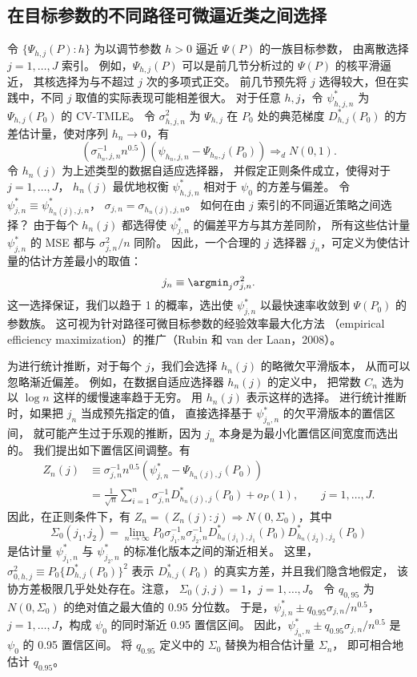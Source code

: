 \subsection{在目标参数的不同路径可微逼近类之间选择}

令 $\{\Psi_{h,j}(P):h\}$ 为以调节参数 $h>0$ 逼近 $\Psi(P)$ 的一族目标参数，
由离散选择 $j=1,\ldots,J$ 索引。
例如，$\Psi_{h,j}(P)$ 可以是前几节分析过的 $\Psi(P)$ 的核平滑逼近，
其核选择为与不超过 $j$ 次的多项式正交。
前几节预先将 $j$ 选得较大，但在实践中，不同 $j$ 取值的实际表现可能相差很大。
对于任意 $h,j$，令 $\psi^*_{h,j,n}$ 为 $\Psi_{h,j}(P_0)$ 的 CV-TMLE。
令 $\sigma_{h,j,n}^2$ 为 $\Psi_{h,j}$ 在 $P_0$ 处的典范梯度
$D_{h,j}^*(P_0)$ 的方差估计量，使对序列 $h_n\to0$，有
\[
 (\sigma^{-1}_{h_n,j,n}n^{0.5})
 (\psi_{h_n,j,n}-\Psi_{h_n,j}(P_0))\Rightarrow_dN(0,1).
\]
令 $h_n(j)$ 为上述类型的数据自适应选择器，
并假定正则条件成立，使得对于 $j=1,\ldots,J$，
$h_n(j)$ 最优地权衡 $\psi^*_{h,j,n}$ 相对于 $\psi_0$ 的方差与偏差。
令 $\psi^*_{j,n}\equiv\psi^*_{h_n(j),j,n}$，
$\sigma_{j,n}=\sigma_{h_n(j),j,n}$。
如何在由 $j$ 索引的不同逼近策略之间选择？
由于每个 $h_n(j)$ 都选得使 $\psi^*_{j,n}$ 的偏差平方与其方差同阶，
所有这些估计量 $\psi^*_{j,n}$ 的 MSE 都与 $\sigma_{j,n}^2/n$ 同阶。
因此，一个合理的 $j$ 选择器 $j_n$，可定义为使估计量的估计方差最小的取值：
\[
 j_n\equiv\argmin_j\sigma_{j,n}^2.
\]
这一选择保证，我们以趋于 1 的概率，选出使
$\psi^*_{j,n}$ 以最快速率收敛到 $\Psi(P_0)$ 的参数族。
这可视为针对路径可微目标参数的经验效率最大化方法
（empirical efficiency maximization）的推广（Rubin 和 van der Laan，2008）。

为进行统计推断，对于每个 $j$，我们会选择 $h_n(j)$ 的略微欠平滑版本，
从而可以忽略渐近偏差。
例如，在数据自适应选择器 $h_n(j)$ 的定义中，
把常数 $C_n$ 选为以 $\log n$ 这样的缓慢速率趋于无穷。
用 $h_n(j)$ 表示这样的选择。
进行统计推断时，如果把 $j_n$ 当成预先指定的值，
直接选择基于 $\psi^*_{j_n,n}$ 的欠平滑版本的置信区间，
就可能产生过于乐观的推断，因为 $j_n$ 本身是为最小化置信区间宽度而选出的。
我们提出如下置信区间调整。有
\[
\begin{aligned}
 Z_n(j)&\equiv\sigma_{j,n}^{-1}n^{0.5}
 (\psi^*_{j,n}-\Psi_{h_n(j),j}(P_0))\\
 &=\frac{1}{\sqrt n}\sum_{i=1}^{n}
 \sigma_{j,n}^{-1}D^*_{h_n(j),j}(P_0)+o_P(1),
 \qquad j=1,\ldots,J.
\end{aligned}
\]
因此，在正则条件下，有
$Z_n=(Z_n(j):j)\Rightarrow N(0,\Sigma_0)$，其中
\[
 \Sigma_0(j_1,j_2)=\lim_{n\to\infty}
 P_0\sigma^{-1}_{j_1,n}\sigma^{-1}_{j_2,n}
 D^*_{h_n(j_1),j_1}(P_0)D^*_{h_n(j_2),j_2}(P_0)
\]
是估计量 $\psi^*_{j_1,n}$ 与 $\psi^*_{j_2,n}$ 的标准化版本之间的渐近相关。
这里，$\sigma_{0,h,j}^2\equiv P_0\{D^*_{h,j}(P_0)\}^2$
表示 $D^*_{h,j}(P_0)$ 的真实方差，并且我们隐含地假定，
该协方差极限几乎处处存在。注意，
$\Sigma_0(j,j)=1$，$j=1,\ldots,J$。
令 $q_{0,95}$ 为 $N(0,\Sigma_0)$ 的绝对值之最大值的 0.95 分位数。
于是，$\psi^*_{j,n}\pm q_{0.95}\sigma_{j,n}/n^{0.5}$，
$j=1,\ldots,J$，构成 $\psi_0$ 的同时渐近 0.95 置信区间。
因此，$\psi^*_{j_n,n}\pm q_{0.95}\sigma_{j,n}/n^{0.5}$
是 $\psi_0$ 的 0.95 置信区间。
将 $q_{0.95}$ 定义中的 $\Sigma_0$ 替换为相合估计量 $\Sigma_n$，
即可相合地估计 $q_{0.95}$。
